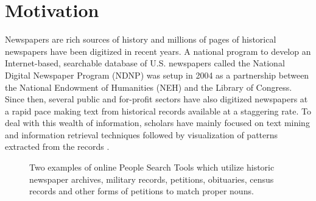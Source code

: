 


\section {Motivation}

Newspapers are rich sources of history and millions of pages of historical newspapers have been digitized \cite{Allen_10} in recent years. A national program to develop an Internet-based, searchable database of U.S. newspapers called the National Digital Newspaper Program (NDNP) was setup in 2004 as a partnership between the National Endowment of Humanities (NEH) and the Library of Congress. Since then, several public and for-profit sectors have also digitized newspapers at a rapid pace making text from historical records available at a staggering rate. To deal with this wealth of information, scholars have mainly focused on text mining and information retrieval techniques followed by visualization of patterns extracted from the records \cite{McKeown_1995, Radev99c, mckeown2002tracking, dutta2011learning, Berberich_2007, khurdiya2011multi, shahaf2010connecting}. 


\begin{figure}[t]
\begin{center}
\caption{Two examples of online People Search Tools which utilize historic newspaper archives, military records, petitions, obituaries, census records and other forms of petitions to match proper nouns.}
\label{figSearch}
\end{center}
\end{figure}


